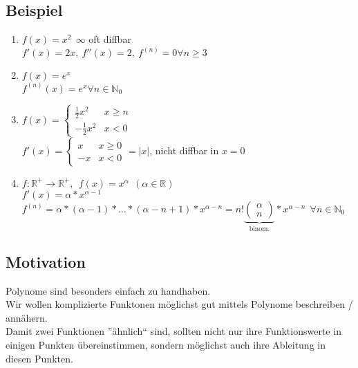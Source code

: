 \subsection{Beispiel}
\begin{enumerate}
	\item
	$f(x)=x^2 \ \ \infty$ oft diffbar\\
	$f'(x)=2x, \ f''(x)=2, \ f^{(n)}=0 \forall n\ge 3$
	
	\item
	$f(x)=e^x$\\
	$f^{(n)}(x)=e^x \forall n\in\mathbb{N}_0$
	
	\item
	$f(x)=\left\lbrace\begin{array}{ll}
	\frac{1}{2}x^2 & x\ge n\\
	-\frac{1}{2}x^2 & x< 0
	\end{array}\right.$\\
	$f'(x)=\left\lbrace\begin{array}{ll}
	x & x\ge 0\\
	-x & x<0
	\end{array}\right. = |x|$, nicht diffbar in $x=0$
	
	\item
	$f:\mathbb{R}^+\rightarrow\mathbb{R}^+, \ \ f(x)=x^\alpha \ \ (\alpha\in\mathbb{R})$\\
	$f'(x)=\alpha*x^{\alpha-1}$\\
	$f^{(n)}=\alpha*(\alpha-1)*\dots*(\alpha-n+1)*x^{\alpha-n} = n!\underbrace{\begin{pmatrix}\alpha \\ n\end{pmatrix}}_{\text{binom.}}*x^{\alpha-n} \ \ \forall n\in\mathbb{N}_0$
\end{enumerate}

\subsection{Motivation}
Polynome sind besonders einfach zu handhaben.\\
Wir wollen komplizierte Funktonen möglichst gut mittels Polynome beschreiben / annähern.\\
Damit zwei Funktionen ''ähnlich`` sind, sollten nicht nur ihre Funktionswerte in einigen Punkten übereinstimmen, sondern möglichst auch ihre Ableitung in diesen Punkten.


